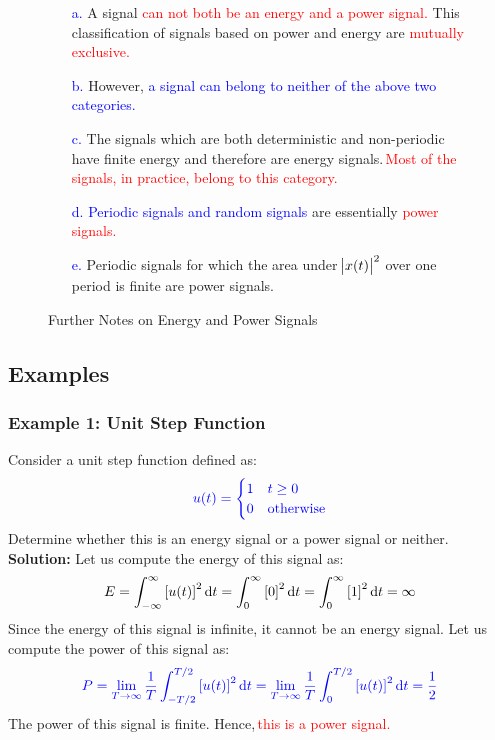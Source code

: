 \documentclass[a4paper,12pt]{report}
\begin{document}
\vspace{-1em}
\begin{figure}[H]
    \centering
    \begin{mdframed}
        \begin{center}
            \begin{itemize}
                \item[\textcolor{blue}{a.}] A signal \textcolor{red}{can not both be an energy and a power signal.} This classification of signals based on power and energy are \textcolor{red}{mutually exclusive.}
                \item[\textcolor{blue}{b.}] However, \textcolor{blue}{a signal can belong to neither of the above two categories.}
                \item[\textcolor{blue}{c.}] The signals which are both deterministic and non-periodic have finite energy and therefore are energy signals.\,\textcolor{red}{Most of the signals, in practice, belong to this category.}
                \item[\textcolor{blue}{d.}] \textcolor{blue}{Periodic signals and random signals} are essentially \textcolor{red}{power signals.}
                \item[\textcolor{blue}{e.}] Periodic signals for which the area under \(\abs{x(t)}^2\) over one period is finite are power signals.
            \end{itemize}
        \end{center}
    \end{mdframed}\label{fig:energy-power-relationship-2}
    \vspace{-1em}\caption{Further Notes on Energy and Power Signals}
\end{figure}
\vspace{-1em}
\subsection{Examples}
\subsubsection{Example 1: Unit Step Function}
Consider a unit step function defined as:
\[
    \textcolor{blue}{u(t) =
        \begin{cases}
            1 & t \geq 0         \\
            0 & \text{otherwise}
        \end{cases}}
\]
Determine whether this is an energy signal or a power signal or neither.\\
\noindent \textbf{Solution:} Let us compute the energy of this signal as:
\[
    E = \int_{-\infty}^{\infty} {[u(t)]}^2 \dif t = \int_{0}^{\infty} {[0]}^2 \dif t = \int_{0}^{\infty} {[1]}^2 \dif t = \infty
\]
Since the energy of this signal is infinite, it cannot be an energy signal. Let us compute the power of this signal as:
\[
    \textcolor{blue}{P = \lim_{T \to \infty} \frac{1}{T} \int_{-T/2}^{T/2} {[u(t)]}^2 \dif t = \lim_{T \to \infty} \frac{1}{T} \int_{0}^{T/2} {[u(t)]}^2 \dif t = \frac{1}{2}}
\]
The power of this signal is finite. Hence,\,\textcolor{red}{this is a power signal.}
\end{document}

